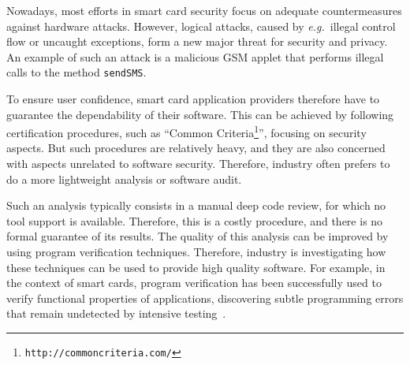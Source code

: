 
Nowadays, most efforts in smart card security focus on adequate
countermeasures against hardware attacks. However, logical attacks,
caused by \emph{e.g.}~\/illegal control flow or uncaught exceptions,
form a new major threat for security and privacy. An example of such
an attack is a malicious GSM applet that performs illegal calls to the
method {\tt sendSMS}.

To ensure user confidence, smart card application providers therefore
have to guarantee the dependability of their software. This can be
achieved by following certification procedures, such as ``Common
Criteria\footnote{\texttt{http://commoncriteria.com/}}'', focusing on
security aspects. But such procedures are relatively heavy, and they
are also concerned with aspects unrelated to software
security. Therefore, industry often prefers to do a more lightweight
analysis or software audit.

Such an analysis typically consists in a manual deep code review, for
which no tool support is available. Therefore, this is a costly
procedure, and there is no formal guarantee of its results. The
quality of this analysis can be improved by using program verification
techniques. Therefore, industry is investigating how these techniques
can be used to provide high quality software. For example, in the
context of smart cards, program verification has been successfully
used to verify functional properties of applications, discovering
subtle programming errors that remain undetected by intensive
testing~\cite{BieberCWZGL02,BreunesseCHJ03}.







